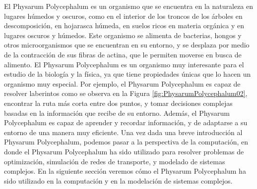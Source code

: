     \vskip 0.5cm
    El Physarum Polycephalum es un organismo que se encuentra en la naturaleza en lugares h\'umedos y oscuros, 
        como en el interior de los troncos de los \'arboles en descomposici\'on, en hojarasca h\'umeda, en suelos 
        ricos en materia org\'anica y en lugares oscuros y h\'umedos. Este organismo se alimenta de bacterias, 
        hongos y otros microorganismos que se encuentran en su entorno, y se desplaza por medio de la contracci\'on 
        de sus fibras de actina, que le permiten moverse en busca de alimento.\cite{Dee1960}
    \vskip 0.5cm
    El Physarum Polycephalum es un organismo muy interesante para el estudio de la biolog\'ia y la f\'isica, 
        ya que tiene propiedades \'unicas que lo hacen un organismo muy especial. Por ejemplo, el Physarum Polycephalum 
        es capaz de resolver laberintos como se observa en la Figura \ref{fig:PhysarumPolycephalum02}, encontrar la ruta m\'as corta entre dos puntos, y tomar decisiones complejas 
        basadas en la informaci\'on que recibe de su entorno. Adem\'as, el Physarum Polycephalum es capaz de aprender 
        y recordar informaci\'on, y de adaptarse a su entorno de una manera muy eficiente.
    \vskip 0.5cm
    Una vez dada una breve introducci\'on al Physarum Polycephalum, podemos pasar a la perspectiva de la computaci\'on, 
        en donde el Physarum Polycephalum ha sido utilizado para resolver problemas de optimizaci\'on, simulaci\'on 
        de redes de transporte, y modelado de sistemas complejos. En la siguiente secci\'on veremos c\'omo el Physarum 
        Polycephalum ha sido utilizado en la computaci\'on y en la modelaci\'on de sistemas complejos.
    